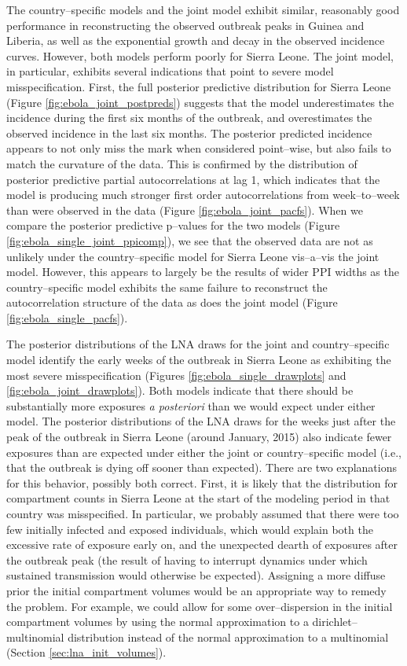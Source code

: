 The country--specific models and the joint model exhibit similar, reasonably good performance in reconstructing the observed outbreak peaks in Guinea and Liberia, as well as the exponential growth and decay in the observed incidence curves. However, both models perform poorly for Sierra Leone. The joint model, in particular, exhibits several indications that point to severe model misspecification.  First, the full posterior predictive distribution for Sierra Leone (Figure \ref{fig:ebola_joint_postpreds}) suggests that the model underestimates the incidence during the first six months of the outbreak, and overestimates the observed incidence in the last six months. The posterior predicted incidence appears to not only miss the mark when considered point--wise, but also fails to match the curvature of the data. This is confirmed by the distribution of posterior predictive partial autocorrelations at lag 1, which indicates that the model is producing much stronger first order autocorrelations from week--to--week than were observed in the data (Figure \ref{fig:ebola_joint_pacfs}). When we compare the posterior predictive p--values for the two models (Figure \ref{fig:ebola_single_joint_ppicomp}), we see that the observed data are not as unlikely under the country--specific model for Sierra Leone vis--a--vis the joint model. However, this appears to largely be the results of wider PPI widths as the country--specific model exhibits the same failure to reconstruct the autocorrelation structure of the data as does the joint model (Figure \ref{fig:ebola_single_pacfs}). 

The posterior distributions of the LNA draws for the joint and country--specific model identify the early weeks of the outbreak in Sierra Leone as exhibiting the most severe misspecification (Figures \ref{fig:ebola_single_drawplots} and \ref{fig:ebola_joint_drawplots}). Both models indicate that there should be substantially more exposures \textit{a posteriori} than we would expect under either model. The posterior distributions of the LNA draws for the weeks just after the peak of the outbreak in Sierra Leone (around January, 2015) also indicate fewer exposures than are expected under either the joint or country--specific model (i.e., that the outbreak is dying off sooner than expected). There are two explanations for this behavior, possibly both correct. First, it is likely that the distribution for compartment counts in Sierra Leone at the start of the modeling period in that country was misspecified. In particular, we probably assumed that there were too few initially infected and exposed individuals, which would explain both the excessive rate of exposure early on, and the unexpected dearth of exposures after the outbreak peak (the result of having to interrupt dynamics under which sustained transmission would otherwise be expected). Assigning a more diffuse prior the initial compartment volumes would be an appropriate way to remedy the problem. For example, we could allow for some over--dispersion in the initial compartment volumes by using the normal approximation to a dirichlet--multinomial distribution instead of the normal approximation to a multinomial (Section \ref{sec:lna_init_volumes}). 

